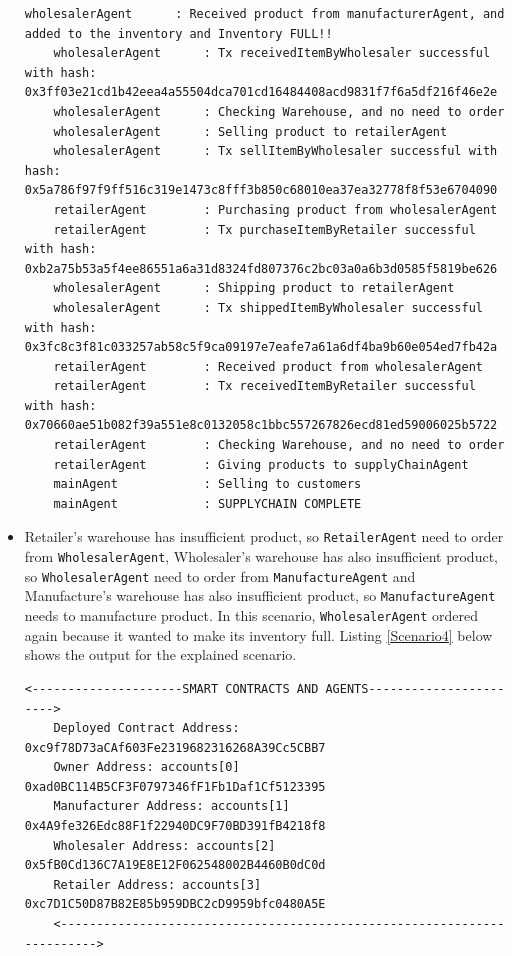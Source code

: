 \begin{itemize}
\begin{lstlisting}[caption={Agent Interaction (Scenario 3},label={Scenario3}, numbers=none, basicstyle=\ttfamily\tiny]
    wholesalerAgent      : Received product from manufacturerAgent, and added to the inventory and Inventory FULL!!
    wholesalerAgent      : Tx receivedItemByWholesaler successful with hash: 0x3ff03e21cd1b42eea4a55504dca701cd16484408acd9831f7f6a5df216f46e2e
    wholesalerAgent      : Checking Warehouse, and no need to order
    wholesalerAgent      : Selling product to retailerAgent
    wholesalerAgent      : Tx sellItemByWholesaler successful with hash: 0x5a786f97f9ff516c319e1473c8fff3b850c68010ea37ea32778f8f53e6704090
    retailerAgent        : Purchasing product from wholesalerAgent
    retailerAgent        : Tx purchaseItemByRetailer successful with hash: 0xb2a75b53a5f4ee86551a6a31d8324fd807376c2bc03a0a6b3d0585f5819be626
    wholesalerAgent      : Shipping product to retailerAgent
    wholesalerAgent      : Tx shippedItemByWholesaler successful with hash: 0x3fc8c3f81c033257ab58c5f9ca09197e7eafe7a61a6df4ba9b60e054ed7fb42a
    retailerAgent        : Received product from wholesalerAgent
    retailerAgent        : Tx receivedItemByRetailer successful with hash: 0x70660ae51b082f39a551e8c0132058c1bbc557267826ecd81ed59006025b5722
    retailerAgent        : Checking Warehouse, and no need to order
    retailerAgent        : Giving products to supplyChainAgent
    mainAgent            : Selling to customers
    mainAgent            : SUPPLYCHAIN COMPLETE
    \end{lstlisting}
    
    \vspace{.5cm}

    \item Retailer's warehouse has insufficient product, so \texttt{RetailerAgent} need to order from \texttt{WholesalerAgent}, Wholesaler's warehouse has also insufficient product, so \texttt{WholesalerAgent} need to order from \texttt{ManufactureAgent} and Manufacture's warehouse has also insufficient product, so \texttt{ManufactureAgent} needs to manufacture product. In this scenario, \texttt{WholesalerAgent} ordered again because it wanted to make its inventory full. Listing \ref{Scenario4} below shows the output for the explained scenario.

    \vspace{.5cm}
    \begin{lstlisting}[caption={Agent Interaction (Scenario 4},label={Scenario4}, numbers=none, basicstyle=\ttfamily\tiny]
    <---------------------SMART CONTRACTS AND AGENTS----------------------->
    Deployed Contract Address: 0xc9f78D73aCAf603Fe2319682316268A39Cc5CBB7
    Owner Address: accounts[0] 0xad0BC114B5CF3F0797346fF1Fb1Daf1Cf5123395
    Manufacturer Address: accounts[1] 0x4A9fe326Edc88F1f22940DC9F70BD391fB4218f8
    Wholesaler Address: accounts[2] 0x5fB0Cd136C7A19E8E12F062548002B4460B0dC0d
    Retailer Address: accounts[3] 0xc7D1C50D87B82E85b959DBC2cD9959bfc0480A5E
    <------------------------------------------------------------------------>
    

\end{lstlisting}
\end{itemize}
